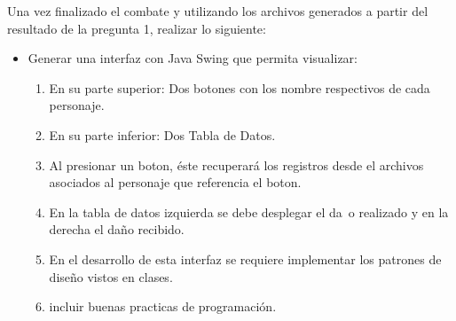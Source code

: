 \documentclass{exam}
\begin{document}
    		\item  Una vez finalizado el combate y utilizando los archivos generados a partir del resultado de la pregunta 1, realizar lo siguiente:
          \begin{itemize}
            \item Generar una interfaz con Java Swing que permita visualizar:
              \begin{enumerate}
                \item En su parte superior: Dos botones con los nombre respectivos de cada personaje.
                \item En su parte inferior: Dos Tabla de Datos.
                \item Al presionar un boton, \'este recuperar\'a los registros desde el archivos asociados al personaje que referencia el boton.
                \item En la tabla de datos izquierda se debe desplegar el da\n~o realizado y en la derecha el daño recibido.
                \item En el desarrollo de esta interfaz se requiere implementar los patrones de diseño vistos en clases.
                \item incluir buenas practicas de programaci\'on.
              \end{enumerate}
          \end{itemize}
\end{document}
